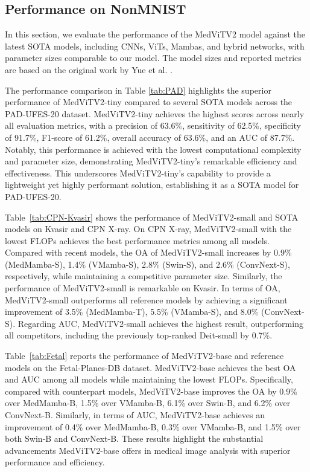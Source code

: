 \documentclass[times,twocolumn,final]{elsarticle}
\begin{document}
\subsection{Performance on NonMNIST}
In this section, we evaluate the performance of the MedViTV2 model against the latest SOTA models, including CNNs, ViTs, Mambas, and hybrid networks, with parameter sizes comparable to our model. The model sizes and reported metrics are based on the original work by Yue et al. \cite{yue2024medmamba}.

The performance comparison in Table \ref{tab:PAD} highlights the superior performance of MedViTV2-tiny compared to several SOTA models across the PAD-UFES-20 dataset. MedViTV2-tiny achieves the highest scores across nearly all evaluation metrics, with a precision of 63.6\%, sensitivity of 62.5\%, specificity of 91.7\%, F1-score of 61.2\%, overall accuracy of 63.6\%, and an AUC of 87.7\%. Notably, this performance is achieved with the lowest computational complexity and parameter size, demonstrating MedViTV2-tiny's remarkable efficiency and effectiveness. This underscores MedViTV2-tiny's capability to provide a lightweight yet highly performant solution, establishing it as a SOTA model for PAD-UFES-20.


Table~\ref{tab:CPN-Kvasir} shows the performance of MedViTV2-small and SOTA models on Kvasir and CPN X-ray. On CPN X-ray, MedViTV2-small with the lowest FLOPs achieves the best performance metrics among all models. Compared with recent models, the OA of MedViTV2-small increases by 0.9\% (MedMamba-S), 1.4\% (VMamba-S), 2.8\% (Swin-S), and 2.6\% (ConvNext-S), respectively, while maintaining a competitive parameter size. Similarly, the performance of MedViTV2-small is remarkable on Kvasir. In terms of OA, MedViTV2-small outperforms all reference models by achieving a significant improvement of 3.5\% (MedMamba-T), 5.5\% (VMamba-S), and 8.0\% (ConvNext-S). Regarding AUC, MedViTV2-small achieves the highest result, outperforming all competitors, including the previously top-ranked Deit-small by 0.7\%.

Table~\ref{tab:Fetal} reports the performance of MedViTV2-base and reference models on the Fetal-Planes-DB dataset. MedViTV2-base achieves the best OA and AUC among all models while maintaining the lowest FLOPs. Specifically, compared with counterpart models, MedViTV2-base improves the OA by 0.9\% over MedMamba-B, 1.5\% over VMamba-B, 6.1\% over Swin-B, and 6.2\% over ConvNext-B. Similarly, in terms of AUC, MedViTV2-base achieves an improvement of 0.4\% over MedMamba-B, 0.3\% over VMamba-B, and 1.5\% over both Swin-B and ConvNext-B. These results highlight the substantial advancements MedViTV2-base offers in medical image analysis with superior performance and efficiency.
\end{document}
